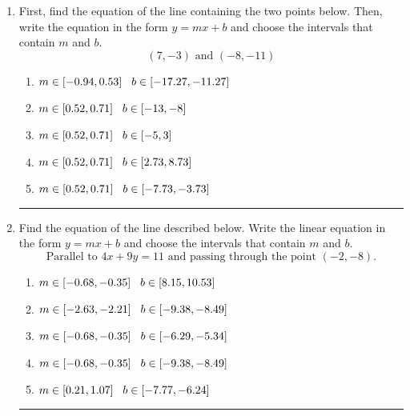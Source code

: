 \documentclass[14pt]{extbook}
\newcommand{\litem}[1]{\item#1\hspace*{-1cm}\rule{\textwidth}{0.4pt}}
\begin{document}
\begin{enumerate}
{\begin{enumerate}[label=\Alph*.]
\end{enumerate} }
\litem{
First, find the equation of the line containing the two points below. Then, write the equation in the form $ y=mx+b $ and choose the intervals that contain $m$ and $b$.\[ (7, -3) \text{ and } (-8, -11) \]\begin{enumerate}[label=\Alph*.]
\item \( m \in [-0.94, 0.53] \hspace*{3mm} b \in [-17.27, -11.27] \)
\item \( m \in [0.52, 0.71] \hspace*{3mm} b \in [-13, -8] \)
\item \( m \in [0.52, 0.71] \hspace*{3mm} b \in [-5, 3] \)
\item \( m \in [0.52, 0.71] \hspace*{3mm} b \in [2.73, 8.73] \)
\item \( m \in [0.52, 0.71] \hspace*{3mm} b \in [-7.73, -3.73] \)

\end{enumerate} }
\litem{
Find the equation of the line described below. Write the linear equation in the form $ y=mx+b $ and choose the intervals that contain $m$ and $b$.\[ \text{Parallel to } 4 x + 9 y = 11 \text{ and passing through the point } (-2, -8). \]\begin{enumerate}[label=\Alph*.]
\item \( m \in [-0.68, -0.35] \hspace*{3mm} b \in [8.15, 10.53] \)
\item \( m \in [-2.63, -2.21] \hspace*{3mm} b \in [-9.38, -8.49] \)
\item \( m \in [-0.68, -0.35] \hspace*{3mm} b \in [-6.29, -5.34] \)
\item \( m \in [-0.68, -0.35] \hspace*{3mm} b \in [-9.38, -8.49] \)
\item \( m \in [0.21, 1.07] \hspace*{3mm} b \in [-7.77, -6.24] \)


\end{enumerate}}
\end{enumerate}
\end{document}
